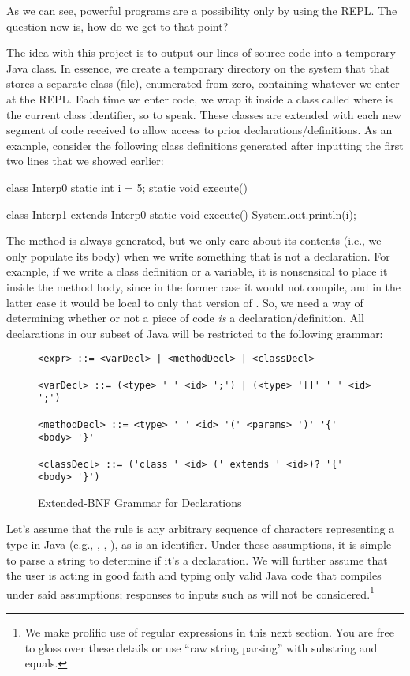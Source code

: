 As we can see, powerful programs are a possibility only by using the REPL. 
The question now is, how do we get to that point?

The idea with this project is to output our lines of source code into a temporary Java class. 
In essence, we create a temporary directory on the system that that stores a separate class (file), enumerated from zero, containing whatever we enter at the REPL. 
Each time we enter code, we wrap it inside a class called  where  is the current class identifier, so to speak. 
These classes are extended with each new segment of code received to allow access to prior declarations/definitions. 
As an example, consider the following class definitions generated after inputting the first two lines that we showed earlier:

\begin{verbnobox}[\small]
class Interp0 {
  static int i = 5;
  static void execute() {}
}

class Interp1 extends Interp0 {
  static void execute() {
    System.out.println(i);  
  }
}
\end{verbnobox}

The  method is always generated, but we only care about its contents (i.e., we only populate its body) when we write something that is not a declaration. 
For example, if we write a class definition or a variable, it is nonsensical to place it inside the  method body, since in the former case it would not compile, and in the latter case it would be local to only that version of . 
So, we need a way of determining whether or not a piece of code \emph{is} a declaration/definition. 
All declarations in our subset of Java will be restricted to the following grammar:

\begin{figure}[H]
\begin{verbatim}
<expr> ::= <varDecl> | <methodDecl> | <classDecl>

<varDecl> ::= (<type> ' ' <id> ';') | (<type> '[]' ' ' <id> ';')

<methodDecl> ::= <type> ' ' <id> '(' <params> ')' '{' <body> '}'

<classDecl> ::= ('class ' <id> (' extends ' <id>)? '{' <body> '}')
\end{verbatim}
\caption{ Extended-BNF Grammar for Declarations }
\end{figure}

Let's assume that the  rule is any arbitrary sequence of characters representing a type in Java (e.g., , , ), as is an identifier. 
Under these assumptions, it is simple to parse a string to determine if it's a declaration. 
We will further assume that the user is acting in good faith and typing only valid Java code that compiles under said assumptions; responses to inputs such as  will not be considered.\footnote{We make prolific use of regular expressions in this next section. You are free to gloss over these details or use ``raw string parsing'' with substring and equals.}

